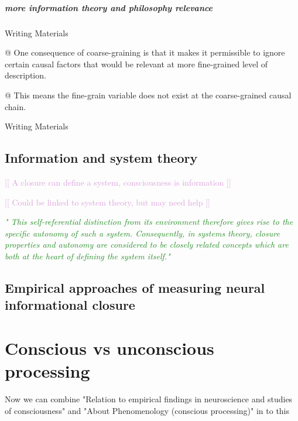 \documentclass[utf8]{article}
\newenvironment{writingMaterials}
			{	
			\begin{tcolorbox}[size=small, colframe=black!20!white, toprule=1mm]
				Writing Materials
			\end{tcolorbox}
			
			\begin{easylist}[itemize]		
			}
			{
			\end{easylist}
			\begin{tcolorbox}[size=small, bottomrule=1mm, halign=flush right, colframe=black!20!white]
				Writing Materials
			\end{tcolorbox}			
			}
\newcommand{\rewrite}[1]{\textcolor{ForestGreen}{\textit{"#1"}}\newline}
\newcommand{\idea}[2][Plum]{\noindent
				\textcolor{#1}{[[ #2 ]]}}
\newcommand{\ideaBox}[1]{
				\begin{tcolorbox}[hyphenationfix, width=12cm, colback=Thistle!50!white, flush right]
					#1
				\end{tcolorbox}
			}
\begin{document}
		
		
		
		
		
		\subparagraph{more information theory and philosophy relevance}
			\begin{writingMaterials}
				@ One consequence of coarse-graining is that it makes it permissible to ignore certain causal factors that would be relevant at more fine-grained level of description. \cite{price2007causation}
				
				@ This means the fine-grain variable does not exist at the coarse-grained causal chain. 
			\end{writingMaterials}
		
		
		

		\subsection{Information and system theory}
			\idea{A closure can define a system, consciousness is information}
			
			\idea{Could be linked to system theory, but may need help}
		
			\rewrite{
				This self-referential distinction from its environment therefore gives rise to the specific autonomy of such a system. Consequently, in systems theory, closure properties and autonomy are considered to be closely related concepts which are both at the heart of defining the system itself.}
			
			
			
		\subsection{Empirical approaches of measuring neural informational closure}
		
		

	\section{Conscious vs unconscious processing}
		\ideaBox{Now we can combine "Relation to empirical findings in neuroscience and studies of consciousness" and "About Phenomenology (conscious processing)" in to this}
	
\end{document}
